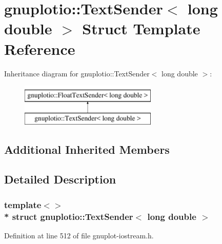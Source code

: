 \hypertarget{structgnuplotio_1_1_text_sender_3_01long_01double_01_4}{}\section{gnuplotio\+:\+:Text\+Sender$<$ long double $>$ Struct Template Reference}
\label{structgnuplotio_1_1_text_sender_3_01long_01double_01_4}
Inheritance diagram for gnuplotio\+:\+:Text\+Sender$<$ long double $>$\+:\begin{figure}[H]
\begin{center}
\leavevmode
\includegraphics[height=2.000000cm]{structgnuplotio_1_1_text_sender_3_01long_01double_01_4}
\end{center}
\end{figure}
\subsection*{Additional Inherited Members}


\subsection{Detailed Description}
\subsubsection*{template$<$$>$\\*
struct gnuplotio\+::\+Text\+Sender$<$ long double $>$}



Definition at line 512 of file gnuplot-\/iostream.\+h.

